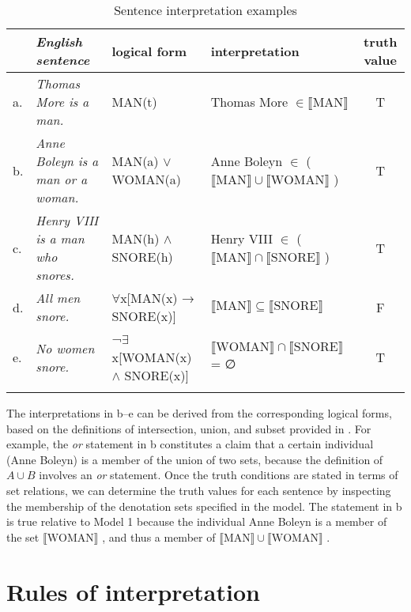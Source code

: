 \begin{table}
\scriptsize
\caption{Sentence interpretation examples}
\label{extab:13.21} 
\begin{tabularx}{\textwidth}{l@{~} >{\itshape}Q@{}l@{~}l@{}c}
\lsptoprule
 & \textup{English sentence} &  logical form &  interpretation &  truth value\\
\midrule
a. &  Thomas More is a man. &  MAN(t) & Thomas More ${\in} \llbracket\text{MAN}\rrbracket$  &   T \\
\tablevspace
b. &  Anne Boleyn is a man or a woman. &  MAN(a) $\vee$ WOMAN(a)  &  Anne Boleyn ${\in}$ ($\llbracket\text{MAN}\rrbracket {\cup} \llbracket\text{WOMAN}\rrbracket$ ) & T\\
\tablevspace
c. &   {Henry VIII is a man who snores}. & MAN(h) $\wedge$ SNORE(h) & Henry VIII ${\in}$ ($\llbracket\text{MAN}\rrbracket {\cap} \llbracket\text{SNORE}\rrbracket$ ) & T\\
\tablevspace
d. & {All men snore}.& ${\forall}$x[MAN(x) → SNORE(x)] & $\llbracket\text{MAN}\rrbracket {\subseteq} \llbracket\text{SNORE}\rrbracket$  & F\\
\tablevspace
e. &   {No women snore.} &  ¬${\exists}$x[WOMAN(x) $\wedge$ SNORE(x)]\hspace{2mm} & $\llbracket\text{WOMAN}\rrbracket {\cap} \llbracket\text{SNORE}\rrbracket$  = ∅ & T\\
\lspbottomrule
\end{tabularx} 
\end{table}

The interpretations in b--e can be derived from the corresponding logical forms, based on the definitions of intersection, union, and subset provided in . For example, the \textit{or} statement in b constitutes a claim that a certain individual (Anne Boleyn) is a member of the union of two sets, because the definition of $A\cup B$ involves an \textit{or} statement. Once the truth conditions are stated in terms of set relations, we can determine the truth values for each sentence by inspecting the membership of the denotation sets specified in the model. The statement in b is true relative to Model 1 because the individual Anne Boleyn is a member of the set $\llbracket\text{WOMAN}\rrbracket$ , and thus a member of $\llbracket\text{MAN}\rrbracket \cup \llbracket\text{WOMAN}\rrbracket$ .


\section{Rules of interpretation}\label{sec:13.5}

